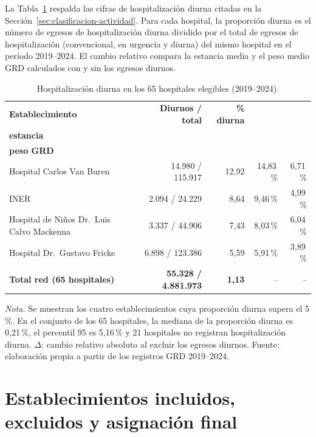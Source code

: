 La Tabla~\ref{tab:anexo-diurna} respalda las cifras de hospitalización diurna
citadas en la Sección~\ref{sec:clasificacion-actividad}. Para cada hospital, la proporción
diurna es el número de egresos de hospitalización diurna dividido por el total
de egresos de hospitalización (convencional, en urgencia y diurna) del mismo
hospital en el período 2019--2024. El cambio relativo compara la estancia media
y el peso medio GRD calculados con y sin los egresos diurnos.

\begin{table}[htbp]
\centering
\caption{Hospitalización diurna en los 65 hospitales elegibles (2019--2024).}
\label{tab:anexo-diurna}
\setlength{\tabcolsep}{3pt}
\begin{tabularx}{\textwidth}{@{}>{\raggedright\arraybackslash}X r r r r@{}}
\toprule
\textbf{Establecimiento} & \textbf{Diurnos / total} & \textbf{\% diurna} &
\shortstack{\textbf{$\Delta$}\\\textbf{estancia}} & \shortstack{\textbf{$\Delta$}\\\textbf{peso GRD}} \\
\midrule
Hospital Carlos Van Buren & 14.980 / 115.917 & 12,92 & 14,83\,\% & 6,71\,\% \\
INER & 2.094 / 24.229 & 8,64 & 9,46\,\% & 4,99\,\% \\
Hospital de Niños Dr.\ Luis Calvo Mackenna & 3.337 / 44.906 & 7,43 & 8,03\,\% & 6,04\,\% \\
Hospital Dr.\ Gustavo Fricke & 6.898 / 123.386 & 5,59 & 5,91\,\% & 3,89\,\% \\
\midrule
\textbf{Total red (65 hospitales)} & \textbf{55.328 / 4.881.973} & \textbf{1,13} & -- & -- \\
\bottomrule
\end{tabularx}
\par\smallskip
\begin{minipage}{\textwidth}
\normalsize\raggedright
\textit{Nota.} Se muestran los cuatro establecimientos cuya proporción diurna
supera el 5\,\%. En el conjunto de los 65 hospitales, la mediana de la
proporción diurna es 0,21\,\%, el percentil 95 es 5,16\,\% y 21 hospitales no
registran hospitalización diurna. $\Delta$: cambio relativo absoluto al excluir
los egresos diurnos. Fuente: elaboración propia a partir de los registros GRD
2019--2024.
\end{minipage}
\end{table}

\section{Establecimientos incluidos, excluidos y asignación final}
\label{anexo:hospitales}


